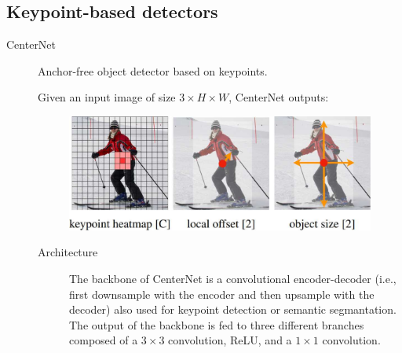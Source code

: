 \subsection{Keypoint-based detectors}

\begin{description}
    \item[CenterNet] 
        Anchor-free object detector based on keypoints.

        Given an input image of size $3 \times H \times W$, CenterNet outputs:

        \begin{figure}[H]
            \centering
            \includegraphics[width=0.5\linewidth]{./img/centernet_outputs.jpg}
        \end{figure}

        \begin{description}
            \item[Architecture] 
                The backbone of CenterNet is a convolutional encoder-decoder (i.e., first downsample with the encoder and then upsample with the decoder) also used for keypoint detection or semantic segmantation. The output of the backbone is fed to three different branches composed of a $3 \times 3$ convolution, ReLU, and a $1 \times 1$ convolution.


\end{description}
\end{description}

